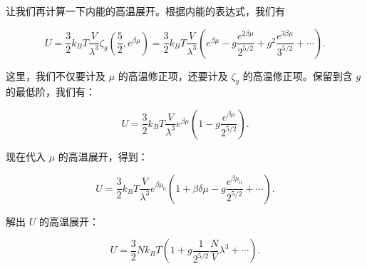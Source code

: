 让我们再计算一下内能的高温展开。根据内能的表达式，我们有
\begin{linenomath}\begin{equation}
    U = \frac{3}{2} k_B T \frac{V}{\lambda^3} \zeta_g\left( \frac{5}{2}, e^{\beta\mu} \right) = \frac{3}{2} k_B T \frac{V}{\lambda^3} \left( e^{\beta\mu} - g \frac{e^{2\beta\mu}}{2^{5/2}} + g^2 \frac{e^{3\beta\mu}}{3^{5/2}} + \cdots \right).
\end{equation}\end{linenomath}
这里，我们不仅要计及 $\mu$ 的高温修正项，还要计及 $\zeta_g$ 的高温修正项。保留到含 $g$ 的最低阶，我们有：
\begin{linenomath}\begin{equation}
    U = \frac{3}{2} k_B T \frac{V}{\lambda^3} e^{\beta\mu} \left( 1 - g \frac{e^{\beta\mu}}{2^{5/2}} \right).
\end{equation}\end{linenomath}
现在代入 $\mu$ 的高温展开，得到：
\begin{linenomath}\begin{equation}
    U = \frac{3}{2} k_B T \frac{V}{\lambda^3} e^{\beta\mu_0} \left( 1 + \beta \delta \mu - g \frac{e^{\beta\mu_0}}{2^{5/2}} + \cdots \right).
\end{equation}\end{linenomath}
解出 $U$ 的高温展开：
\begin{linenomath}\begin{equation}
    U = \frac{3}{2} N k_B T \left( 1 + g \frac{1}{2^{5/2}} \frac{N}{V} \lambda^3 + \cdots \right).
\end{equation}\end{linenomath}

